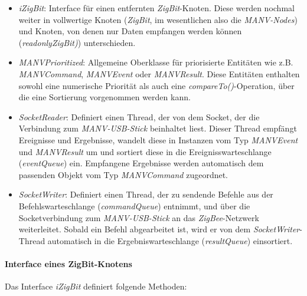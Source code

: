     \begin{itemize}
        \item{\emph{iZigBit}:} Interface für einen entfernten \emph{ZigBit}-Knoten. Diese werden nochmal weiter
                        in vollwertige Knoten (\emph{ZigBit}, im wesentlichen also die \emph{MANV-Nodes})
                        und Knoten, von denen nur Daten empfangen werden können (\emph{readonlyZigBit)})
                        unterschieden.
        \item{\emph{MANVPrioritized}:} Allgemeine Oberklasse für priorisierte Entitäten wie z.B. \emph{MANVCommand},
                                \emph{MANVEvent} oder \emph{MANVResult}. Diese Entitäten enthalten 
                                sowohl eine numerische Priorität als auch eine \emph{compareTo()}-Operation,
                                über die eine Sortierung vorgenommen werden kann.
        \item{\emph{SocketReader}:} Definiert einen Thread, der von dem Socket, der die Verbindung zum \emph{MANV-USB-Stick}
                             beinhaltet liest. Dieser Thread empfängt Ereignisse und Ergebnisse, wandelt diese 
                             in Instanzen vom Typ \emph{MANVEvent} und \emph{MANVResult} um und sortiert diese
                             in die Ereignisswarteschlange (\emph{eventQueue}) ein. Empfangene Ergebnisse werden
                             automatisch dem passenden Objekt vom Typ \emph{MANVCommand} zugeordnet.
        \item{\emph{SocketWriter}:} Definiert einen Thread, der zu sendende Befehle aus der Befehlswarteschlange
                             (\emph{commandQueue}) entnimmt, und über die Socketverbindung zum \emph{MANV-USB-Stick}
                             an das \emph{ZigBee}-Netzwerk weiterleitet. Sobald ein Befehl abgearbeitet ist,
                             wird er von dem \emph{SocketWriter}-Thread automatisch in die Ergebniswarteschlange 
                             (\emph{resultQueue}) einsortiert.
    \end{itemize}


    \paragraph{Interface eines ZigBit-Knotens}

    Das Interface \emph{iZigBit} definiert folgende Methoden:


